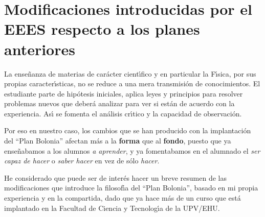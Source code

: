 \chapter {Modificaciones introducidas por el EEES respecto a los planes anteriores}
\label{PD-comp}

La ense\~{n}anza de materias de car\'{a}cter cient\'{\i}fico y en particular
la F\'{\i}sica, por sus propias caracter\'{\i}sticas, no se 
reduce a una mera transmisi\'{o}n de conocimientos. 
El estudiante parte de hip\'{o}tesis iniciales, aplica leyes y principios
para resolver problemas nuevos que  deber\'{a} analizar
para ver si est\'{a}n de acuerdo con la experiencia.
As\'{\i} se fomenta el an\'{a}lisis cr\'{\i}tico y la capacidad de 
observaci\'{o}n.

Por eso en nuestro caso, los cambios que se han  producido con 
la implantaci\'{o}n del ``Plan Bolonia'' afectan m\'{a}s a la {\bf forma}
que al {\bf fondo}, puesto que ya ense\~{n}abamos a los
alumnos {\it a aprender}, 
y ya fomentabamos en el alumnado el {\it ser capaz de hacer} o
{\it saber hacer} en vez de s\'{o}lo {\it hacer}. 

He considerado que puede ser de inter\'{e}s hacer un breve resumen
de las modificaciones que introduce la filosof\'{\i}a del ``Plan Bolonia'',
 basado
en mi propia experiencia y en la compartida, dado que ya hace
 m\'{a}s de un curso 
que est\'{a} implantado en la Facultad de Ciencia y Tecnolog\'{\i}a de la UPV/EHU.

